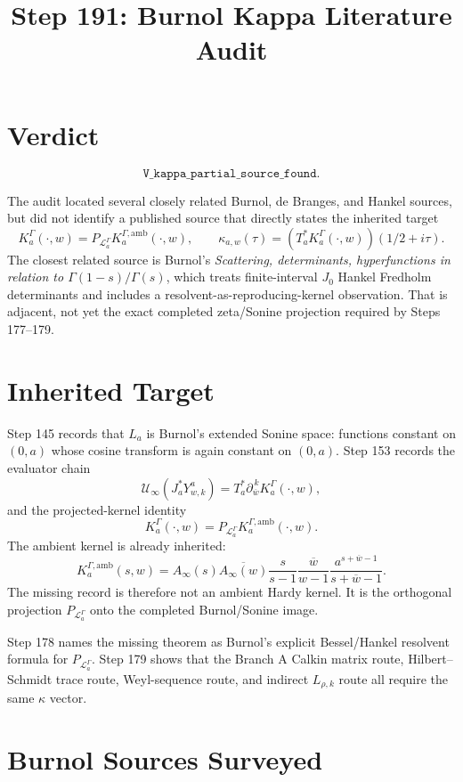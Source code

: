 \documentclass[11pt]{article}
\title{Step 191: Burnol Kappa Literature Audit}
\date{}
\newcommand{\Kamb}{K_a^{\Gamma,\mathrm{amb}}}
\newcommand{\KG}{K_a^\Gamma}
\newcommand{\PL}{P_{\mathcal L_a^\Gamma}}
\newcommand{\kappaaw}{\kappa_{a,w}}
\begin{document}
\maketitle

\section*{Verdict}

\[
\boxed{\texttt{V\_kappa\_partial\_source\_found}}.
\]

The audit located several closely related Burnol, de Branges, and Hankel sources, but did not identify a published source that directly states the inherited target
\[
\KG(\cdot,w)=\PL\Kamb(\cdot,w),
\qquad
\kappaaw(\tau)=(T_a^*\KG(\cdot,w))(1/2+i\tau).
\]
The closest related source is Burnol's \emph{Scattering, determinants, hyperfunctions in relation to \(\Gamma(1-s)/\Gamma(s)\)}, which treats finite-interval \(J_0\) Hankel Fredholm determinants and includes a resolvent-as-reproducing-kernel observation.  That is adjacent, not yet the exact completed zeta/Sonine projection required by Steps 177--179.

\section*{Inherited Target}

Step 145 records that \(L_a\) is Burnol's extended Sonine space: functions constant on \((0,a)\) whose cosine transform is again constant on \((0,a)\).  Step 153 records the evaluator chain
\[
\mathcal U_\infty(J_a^*Y^a_{w,k})
=
T_a^*\partial_{\overline w}^{\,k}\KG(\cdot,w),
\]
and the projected-kernel identity
\[
\KG(\cdot,w)=\PL\Kamb(\cdot,w).
\]
The ambient kernel is already inherited:
\[
\Kamb(s,w)=
A_\infty(s)\overline{A_\infty(w)}
\frac{s}{s-1}\overline{\frac{w}{w-1}}
\frac{a^{s+\overline w-1}}{s+\overline w-1}.
\]
The missing record is therefore not an ambient Hardy kernel.  It is the orthogonal projection \(\PL\) onto the completed Burnol/Sonine image.

Step 178 names the missing theorem as Burnol's explicit Bessel/Hankel resolvent formula for \(\PL\).  Step 179 shows that the Branch A Calkin matrix route, Hilbert--Schmidt trace route, Weyl-sequence route, and indirect \(L_{\rho,k}\) route all require the same \(\kappa\) vector.

\section*{Burnol Sources Surveyed}
\end{document}
